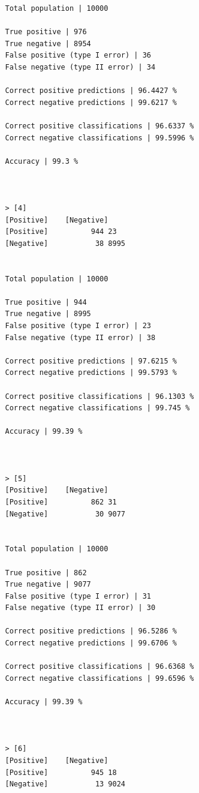 \documentclass{classrep}
\begin{document}
{{{\begin{lstlisting}
                Total population | 10000

                True positive | 976
                True negative | 8954
                False positive (type I error) | 36
                False negative (type II error) | 34

                Correct positive predictions | 96.4427 %
                Correct negative predictions | 99.6217 %

                Correct positive classifications | 96.6337 %
                Correct negative classifications | 99.5996 %

                Accuracy | 99.3 %



                > [4]
                [Positive]    [Negative]
                [Positive]          944 23
                [Negative]           38 8995


                Total population | 10000

                True positive | 944
                True negative | 8995
                False positive (type I error) | 23
                False negative (type II error) | 38

                Correct positive predictions | 97.6215 %
                Correct negative predictions | 99.5793 %

                Correct positive classifications | 96.1303 %
                Correct negative classifications | 99.745 %

                Accuracy | 99.39 %



                > [5]
                [Positive]    [Negative]
                [Positive]          862 31
                [Negative]           30 9077


                Total population | 10000

                True positive | 862
                True negative | 9077
                False positive (type I error) | 31
                False negative (type II error) | 30

                Correct positive predictions | 96.5286 %
                Correct negative predictions | 99.6706 %

                Correct positive classifications | 96.6368 %
                Correct negative classifications | 99.6596 %

                Accuracy | 99.39 %



                > [6]
                [Positive]    [Negative]
                [Positive]          945 18
                [Negative]           13 9024



\end{lstlisting}}}}
\end{document}
